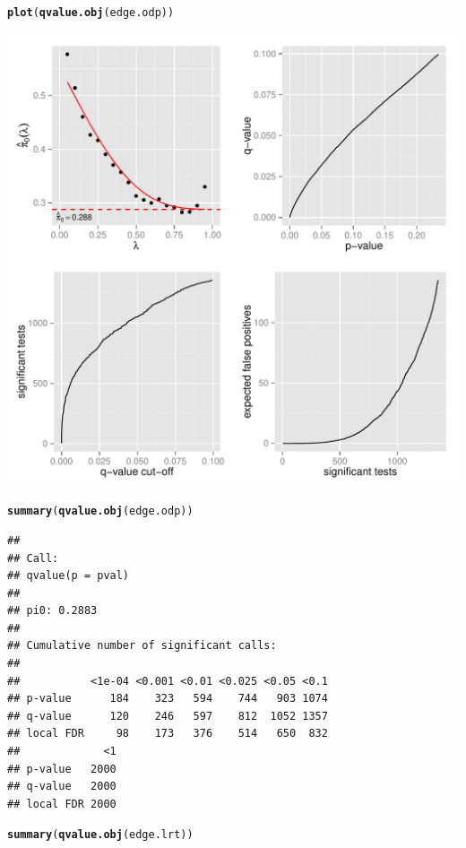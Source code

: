\documentclass{article}\usepackage[]{graphicx}\usepackage[]{color}
\makeatletter
\def\maxwidth{ %
  \ifdim\Gin@nat@width>\linewidth
    \linewidth
  \else
    \Gin@nat@width
  \fi
}
\newcommand{\hlstd}[1]{\textcolor[rgb]{0.345,0.345,0.345}{#1}}%
\newcommand{\hlkwd}[1]{\textcolor[rgb]{0.737,0.353,0.396}{\textbf{#1}}}%
\newenvironment{kframe}{%
 \def\at@end@of@kframe{}%
 \ifinner\ifhmode%
  \def\at@end@of@kframe{\end{minipage}}%
  \begin{minipage}{\columnwidth}%
 \fi\fi%
 \def\FrameCommand##1{\hskip\@totalleftmargin \hskip-\fboxsep
 \colorbox{shadecolor}{##1}\hskip-\fboxsep
     \hskip-\linewidth \hskip-\@totalleftmargin \hskip\columnwidth}%
 \MakeFramed {\advance\hsize-\width
   \@totalleftmargin\z@ \linewidth\hsize
   \@setminipage}}%
 {\par\unskip\endMakeFramed%
 \at@end@of@kframe}
\newenvironment{knitrout}{}{} %
\makeatother
\begin{document}
\begin{knitrout}
\color{fgcolor}\begin{kframe}
\begin{alltt}
\hlkwd{plot}\hlstd{(}\hlkwd{qvalue.obj}\hlstd{(edge.odp))}
\end{alltt}
\end{kframe}

{\centering \includegraphics[width=\maxwidth]{figure/unnamed-chunk-3} 

}


\begin{kframe}\begin{alltt}
\hlkwd{summary}\hlstd{(}\hlkwd{qvalue.obj}\hlstd{(edge.odp))}
\end{alltt}
\begin{verbatim}
## 
## Call:
## qvalue(p = pval)
## 
## pi0:	0.2883	
## 
## Cumulative number of significant calls:
## 
##           <1e-04 <0.001 <0.01 <0.025 <0.05 <0.1
## p-value      184    323   594    744   903 1074
## q-value      120    246   597    812  1052 1357
## local FDR     98    173   376    514   650  832
##             <1
## p-value   2000
## q-value   2000
## local FDR 2000
\end{verbatim}
\begin{alltt}
\hlkwd{summary}\hlstd{(}\hlkwd{qvalue.obj}\hlstd{(edge.lrt))}
\end{alltt}


{\ttfamily\noindent\bfseries\color{errorcolor}{\#\# Error: error in evaluating the argument 'object' in selecting a method for function 'qvalue.obj': Error: object 'edge.lrt' not found}}\end{kframe}
\end{knitrout}
\end{document}
